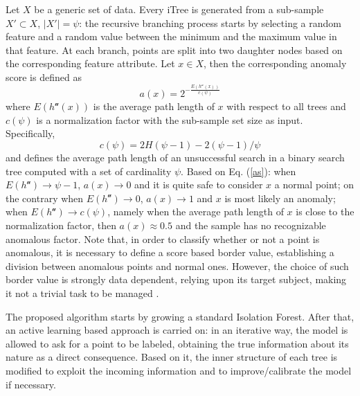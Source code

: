 Let $X$ be a generic set of data. Every iTree is generated from a sub-sample $X' \subset X$, $|X'|= \psi$: the recursive branching process starts by selecting a random feature and a random value between the minimum and the maximum value in that feature. At each branch, points are split into two daughter nodes based on the corresponding feature attribute. 
Let $x \in X$, then the corresponding anomaly score is defined as
\begin{equation}
    a(x) = 2^{-\frac{E(h^\mathcal{u}(x))}{c(\psi)}} \label{as}
\end{equation}
where $E(h^\mathcal{u}(x))$ is the average path length of $x$ with respect to all trees and $c(\psi)$ is a normalization factor with the sub-sample set size as input. Specifically, \[c(\psi)=2H(\psi - 1)-2(\psi-1)/\psi\] and defines the average path length of an unsuccessful search in a binary search tree computed with a set of cardinality $\psi$. Based on Eq. (\ref{as}): when $E(h^\mathcal{u}) \rightarrow \psi -1$, $a(x)\rightarrow 0$ and it is quite safe to consider $x$ a normal point; on the contrary when $E(h^\mathcal{u}) \rightarrow 0$, $a(x)\rightarrow 1$ and $x$ is most likely an anomaly; when $E(h^\mathcal{u}) \rightarrow c(\psi)$, namely when the average path length of $x$ is close to the normalization factor, then $a(x) \approx 0.5$ and the sample has no recognizable anomalous factor. Note that, in order to classify whether or not a point is anomalous, it is necessary to define a score based border value, establishing a division between anomalous points and normal ones. However, the choice of such border value is strongly data dependent, relying upon its target subject, making it not a trivial task to be managed \cite{hofmockel2018isolation}.

The proposed algorithm starts by growing a standard Isolation Forest.
After that, an active learning based approach is carried on: in an iterative way, the model is allowed to ask for a point to be labeled, obtaining the true information about its nature as a direct consequence. Based on it, the inner structure of each tree is modified to exploit the incoming information and to improve/calibrate the model if necessary.

